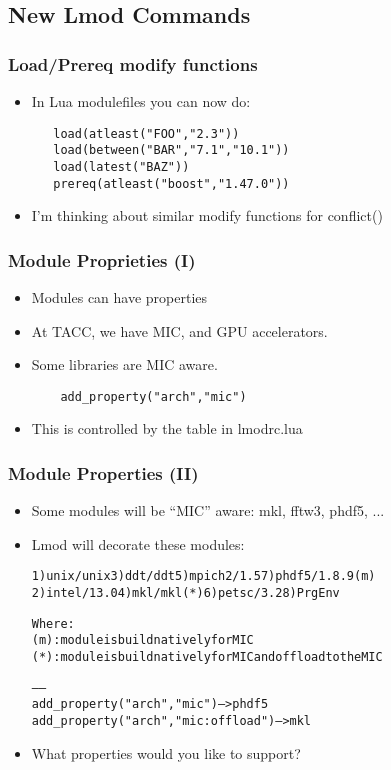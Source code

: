 \documentclass{beamer}
\begin{document}
\subsection{New Lmod Commands}
\label{sec:cmds}

\begin{frame}[fragile]
    \frametitle{Load/Prereq modify functions}
  \begin{itemize}
    \item In Lua modulefiles you can now do:
    {\small
\begin{verbatim}
   load(atleast("FOO","2.3"))
   load(between("BAR","7.1","10.1"))
   load(latest("BAZ"))
   prereq(atleast("boost","1.47.0"))
\end{verbatim}
}
    \item I'm thinking about similar modify functions for conflict()
  \end{itemize}
\end{frame}

\begin{frame}[fragile]
    \frametitle{Module Proprieties (I)}
  \begin{itemize}
    \item Modules can have properties
    \item At TACC, we have MIC, and GPU accelerators.
    \item Some libraries are MIC aware.
    {\small
\begin{verbatim}
    add_property("arch","mic")
\end{verbatim}
}
    \item This is controlled by the table in lmodrc.lua
  \end{itemize}
\end{frame}

\begin{frame}[fragile]
    \frametitle{Module Properties (II)}
  \begin{itemize}
    \item Some modules will be ``MIC'' aware: mkl, fftw3, phdf5, ...
    \item Lmod will decorate these modules:
  {\tiny
    \begin{alltt}
  1) unix/unix     3) ddt/ddt       5) mpich2/1.5    7) {\color{blue}phdf5/1.8.9 (m)}
  2) intel/13.0    4) {\color{red}mkl/mkl (*)}   6) petsc/3.2     8) PrgEnv

  Where:
   {\color{blue}(m)}:  module is build natively for MIC
   {\color{red}(*)}:  module is build natively for MIC and offload to the MIC

   ------
   add_property("arch","mic")              -- > phdf5
   add_property("arch","mic:offload")      -- > mkl
    \end{alltt}
}
  \item What properties would you like to support?
  \end{itemize}
\end{frame}
\end{document}

